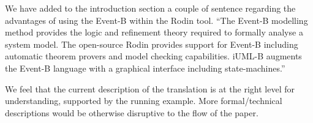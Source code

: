 \documentclass{response}
\begin{document}
\begin{comment}{Reviewer \#2}
  The goal appears to be to try to create something that resembles
  StateCharts but is bound to the semantics of Event-B.  In this case,
  the authors should also justify why Event-B is a suitable language
  for representing Statecharts behavior.  In this case, it appeared
  that the target language made some aspects of behavior difficult to
  formalize.  
\end{comment}

\begin{response}
  We have added to the introduction section a couple of sentence regarding the advantages of using 
  the Event-B within the Rodin tool.
  ``The Event-B modelling method provides the logic and refinement theory required to formally analyse a system model.  The open-source Rodin provides support for Event-B including automatic theorem provers and model checking capabilities. iUML-B augments the Event-B language with a graphical interface including state-machines.''
\end{response}

\begin{comment}{Reviewer \#2}
  In addition, I would have liked a more formal description of the
  translation, or at least a reference to a more formal description of
  the translation than the prose description of different model
  aspects.  
\end{comment}

\begin{response}
  We feel that the current description of the translation is at the right level for understanding, supported by the running example. More formal/technical descriptions would be otherwise disruptive to the flow of the paper.
\end{response}





\begin{comment}{Reviewer \#3}
  Page 1:

  * Line -2, it says:

  "While functional properties (usually) can be tested, safety,
  security and reliability properties
  (usually) must be proved formally."

  "Can" ... and ... "must" ... why?
\end{comment}
\end{document}
